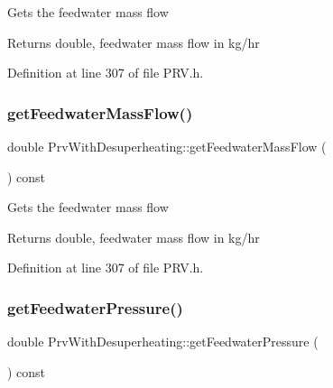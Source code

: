 Gets the feedwater mass flow \begin{DoxyReturn}{Returns}
double, feedwater mass flow in kg/hr 
\end{DoxyReturn}


Definition at line 307 of file P\+R\+V.\+h.

\mbox{\label{class_prv_with_desuperheating_a9bd8ee7d5b563110a7279102352b8f4d}} 
\subsubsection{\texorpdfstring{get\+Feedwater\+Mass\+Flow()}{getFeedwaterMassFlow()}\hspace{0.1cm}{\footnotesize\ttfamily [3/3]}}
{\footnotesize\ttfamily double Prv\+With\+Desuperheating\+::get\+Feedwater\+Mass\+Flow (\begin{DoxyParamCaption}{ }\end{DoxyParamCaption}) const\hspace{0.3cm}{\ttfamily [inline]}}

Gets the feedwater mass flow \begin{DoxyReturn}{Returns}
double, feedwater mass flow in kg/hr 
\end{DoxyReturn}


Definition at line 307 of file P\+R\+V.\+h.

\mbox{\label{class_prv_with_desuperheating_a260bbe19272694af509fb408a821b041}} 
\subsubsection{\texorpdfstring{get\+Feedwater\+Pressure()}{getFeedwaterPressure()}\hspace{0.1cm}{\footnotesize\ttfamily [1/3]}}
{\footnotesize\ttfamily double Prv\+With\+Desuperheating\+::get\+Feedwater\+Pressure (\begin{DoxyParamCaption}{ }\end{DoxyParamCaption}) const\hspace{0.3cm}{\ttfamily [inline]}}

